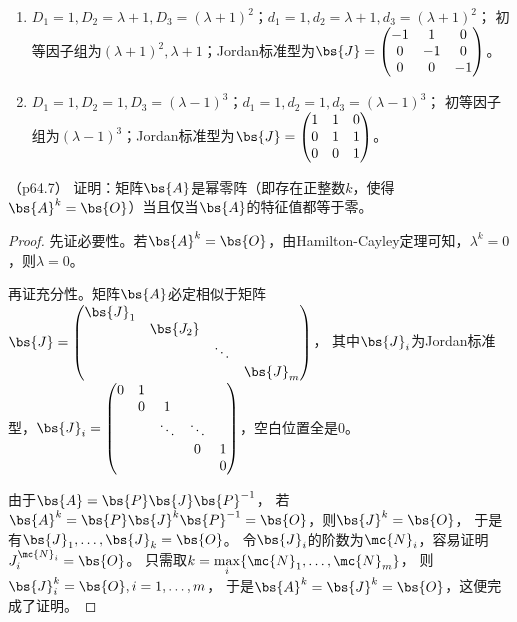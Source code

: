 \documentclass[12pt, a4paper, oneside, UTF8]{ctexbook}
\begin{document}
\begin{solution}
    \begin{enumerate}[label=(\arabic*)]
        \item $D_1=1,D_2=\lambda+1,D_3=(\lambda+1)^2$；$d_1=1,d_2=\lambda+1,d_3=(\lambda+1)^2$；
        初等因子组为$(\lambda+1)^2,\lambda+1$；Jordan标准型为$\bs{J}=\begin{pmatrix}
            -1 & 1& 0\\
            0 & -1& 0 \\
            0 &0 & -1
        \end{pmatrix}$。
        \item $D_1=1,D_2=1,D_3=(\lambda-1)^3$；$d_1=1,d_2=1,d_3=(\lambda-1)^3$；
        初等因子组为$(\lambda-1)^3$；Jordan标准型为$\bs{J}=\begin{pmatrix}
            1 & 1& 0\\
            0 & 1& 1 \\
            0 &0 & 1
        \end{pmatrix}$。
    \end{enumerate}
\end{solution}

\begin{question}（p64.7）
    证明：矩阵$\bs{A}$是幂零阵（即存在正整数$k$，使得$\bs{A}^k=\bs{O}$）当且仅当$\bs{A}$的特征值都等于零。
\end{question}

\begin{proof}
    先证必要性。若$\bs{A}^k=\bs{O}$，由Hamilton-Cayley定理可知，$\lambda^k=0$，则$\lambda=0$。

    再证充分性。矩阵$\bs{A}$必定相似于矩阵$\bs{J}
        =\begin{pmatrix}
            \bs{J}_1 & & & \\
            & \bs{J_2} & & \\
            & & \ddots & \\
            & & & \bs{J}_m
        \end{pmatrix}$，
    其中$\bs{J}_i$为Jordan标准型，$\bs{J}_i=\begin{pmatrix}
        0 & 1 & & \\
        & 0 & 1& &\\
        & & \ddots & \ddots\\
        & & & 0& 1\\
        & & & & 0
    \end{pmatrix}$，空白位置全是0。

    由于$\bs{A}=\bs{P}\bs{J}\bs{P}^{-1}$，
    若$\bs{A}^k=\bs{P}\bs{J}^k\bs{P}^{-1}=\bs{O}$，则$\bs{J}^k=\bs{O}$，
    于是有$\bs{J}_1,\ldots,\bs{J}_k=\bs{O}$。
    令$\bs{J}_i$的阶数为$\mc{N}_i$，容易证明$J_i^{\mc{N}_i}=\bs{O}$。
    只需取$k=\max\limits_i\{\mc{N}_1,\ldots,\mc{N}_m\}$，
    则$\bs{J}_i^k=\bs{O},i=1,\ldots,m$，
    于是$\bs{A}^k=\bs{J}^k=\bs{O}$，这便完成了证明。

\end{proof}
\end{document}
